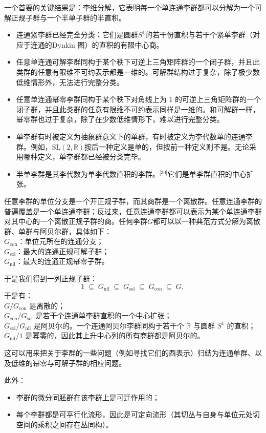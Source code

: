 一个首要的关键结果是：李维分解，它表明每一个单连通李群都可以分解为一个可解正规子群与一个半单子群的半直积。
\begin{itemize}
\item 连通紧李群已经完全分类：它们是圆群$S^1$的若干份直积与若干个紧单李群（对应于连通的Dynkin 图）的直积的有限中心商。
\item 任意单连通可解李群同构于某个秩下可逆上三角矩阵群的一个闭子群，并且此类群的任意有限维不可约表示都是一维的。可解群结构过于复杂，除了极少数低维情形外，无法进行完整分类。
\item 任意单连通幂零李群同构于某个秩下对角线上为 1 的可逆上三角矩阵群的一个闭子群，并且此类群的任意有限维不可约表示同样是一维的。和可解群一样，幂零群也过于复杂，除了在少数低维情形下，难以进行完整分类。
\item 单李群有时被定义为抽象群意义下的单群，有时被定义为李代数单的连通李群。例如，$\mathrm{SL}(2,\mathbb{R})$按后一种定义是单的，但按前一种定义则不是。无论采用哪种定义，单李群都已经被分类完毕。
\item 半单李群是其李代数为单李代数直积的李群。\(^\text{[30]}\)它们是单李群直积的中心扩张。
\end{itemize}
任意李群的单位分支是一个开正规子群，而其商群是一个离散群。任意连通李群的普遍覆盖是一个单连通李群；反过来，任意连通李群都可以表示为某个单连通李群对其中心的一个离散正规子群的商。任何李群$G$都可以以一种典范方式分解为离散群、单群与阿贝尔群，具体如下：\\
$G_{\mathrm{con}}$：单位元所在的连通分支；\\
$G_{\mathrm{sol}}$：最大的连通正规可解子群；\\
$G_{\mathrm{nil}}$：最大的连通正规幂零子群。

于是我们得到一列正规子群：
$$
1 \;\subseteq\; G_{\mathrm{nil}} \;\subseteq\; G_{\mathrm{sol}} \;\subseteq\; G_{\mathrm{con}} \;\subseteq\; G.~
$$
于是有：\\
$G / G_{\mathrm{con}}$ 是离散的；\\
$G_{\mathrm{con}} / G_{\mathrm{sol}}$ 是若干个连通单李群直积的一个中心扩张；\\
$G_{\mathrm{sol}} / G_{\mathrm{nil}}$ 是阿贝尔的。一个连通阿贝尔李群同构于若干个 $\mathbb{R}$ 与圆群 $S^1$ 的直积；\\
$G_{\mathrm{nil}} / 1$ 是幂零的，因此其上升中心列的所有商群都是阿贝尔的。

这可以用来把关于李群的一些问题（例如寻找它们的酉表示）归结为连通单群、以及低维的幂零与可解子群的相应问题。

此外：
\begin{itemize}
\item 李群的微分同胚群在该李群上是可迁作用的；
\item 每个李群都是可平行化流形，因此是可定向流形（其切丛与自身与单位元处切空间的乘积之间存在丛同构）。
\end{itemize}
